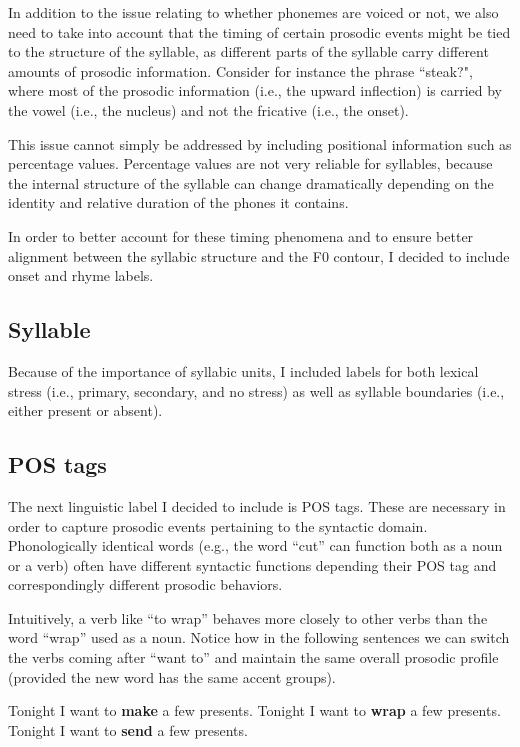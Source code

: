 In addition to the issue relating to whether phonemes are voiced or not, we also need to take into account that the timing of certain prosodic events might be tied to the structure of the syllable, as different parts of the syllable carry different amounts of prosodic information.
Consider for instance the phrase ``steak?", where most of the prosodic information (i.e., the upward inflection) is carried by the vowel (i.e., the nucleus) and not the fricative (i.e., the onset).

This issue cannot simply be addressed by including positional information such as percentage values.
Percentage values are not very reliable for syllables, because the internal structure of the syllable can change dramatically depending on the identity and relative duration of the phones it contains.

In order to better account for these timing phenomena and to ensure better alignment between the syllabic structure and the \ac{F0} contour, I decided to include onset and rhyme labels.



\subsection{Syllable}

Because of the importance of syllabic units, I included labels for both lexical stress (i.e., primary, secondary, and no stress) as well as syllable boundaries (i.e., either present or absent).

\subsection{\ac{POS} tags}

The next linguistic label I decided to include is \ac{POS} tags.
These are necessary in order to capture prosodic events pertaining to the syntactic domain. 
Phonologically identical words (e.g., the word ``cut'' can function both as a noun or a verb) often have different syntactic functions depending their \ac{POS} tag and correspondingly different prosodic behaviors.

Intuitively, a verb like ``to wrap'' behaves more closely to other verbs than the word ``wrap'' used as a noun. 
Notice how in the following sentences we can switch the verbs coming after ``want to'' and maintain the same overall prosodic profile (provided the new word has the same accent groups).

\begin{exe}
    \ex Tonight I want to \textbf{make} a few presents.
    \ex Tonight I want to \textbf{wrap} a few presents.
    \ex Tonight I want to \textbf{send} a few presents.
\end{exe}



